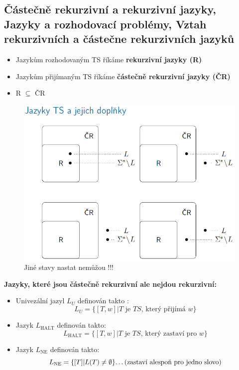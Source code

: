 \documentclass[10pt,a4paper]{article}
\theoremstyle{note}
\begin{document}
	\subsection{Částečně rekurzivní a rekurzivní jazyky, Jazyky a rozhodovací problémy, Vztah rekurzivních a částečne rekurzivních jazyků }

		\begin{itemize}
			\item Jazykům rozhodovaným TS říkáme \textbf{rekurzivní jazyky (R)}
			\item Jazykům přijímaným TS říkáme \textbf{ částečně rekurzivní jazyky (ČR)}
			\item R $\subseteq$ ČR
		\end{itemize}


		\begin{figure}[!h]
		\centering
		\includegraphics[width=12cm]{img/jazykyAJejichDoplnky.png}
		\caption{Jiné stavy nastat nemůžou !!!}
		\end{figure}

		\vspace{1cm}
		\textbf{Jazyky, které jsou částečně rekurzivní ale nejdou rekurzivní:}

		\begin{itemize}
			\item Univezální jazyl $L_{U}$ definován takto : $$L_{U} = \{ [T,w]| T \text{ je } TS \text{, který přijímá } w\}$$
			\item Jazyk $L_{\text{HALT}}$ definován takto:
						$$L_{\text{HALT}} = \{ [T,w]| T \text{ je } TS \text{, který zastaví pro } w\}$$
			\item Jazyk  $L_{\text{NE}}$ definován takto:
					$$L_{\text{NE}} = \{ [ T ] |  L(T)  \neq  \emptyset\} \text{\dots (zastaví alespoň pro jedno slovo)} $$

		\end{itemize}
\end{document}
